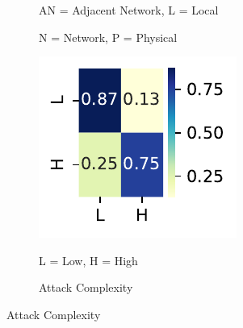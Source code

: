 \documentclass[12pt]{article}
\begin{document}
\begin{figure}[H]
\begin{subfigure}[t]{0.45\textwidth}
		\begin{tablenotes}
			\footnotesize
			\item \quad AN = Adjacent Network, L = Local
			\item \quad N = Network, P = Physical
		\end{tablenotes}
	\end{subfigure}
	\hfill
	\begin{subfigure}[t]{0.45\textwidth}
		\includegraphics[width=\textwidth]{./figures/confusion_matrices/attack_complexity_mitre.pdf}
		\caption{Attack Complexity}
		\begin{tablenotes}
			\footnotesize
			\item \quad L = Low, H = High
		\end{tablenotes}
	\end{subfigure}

	\vspace{1em}


\end{figure}
\end{document}
